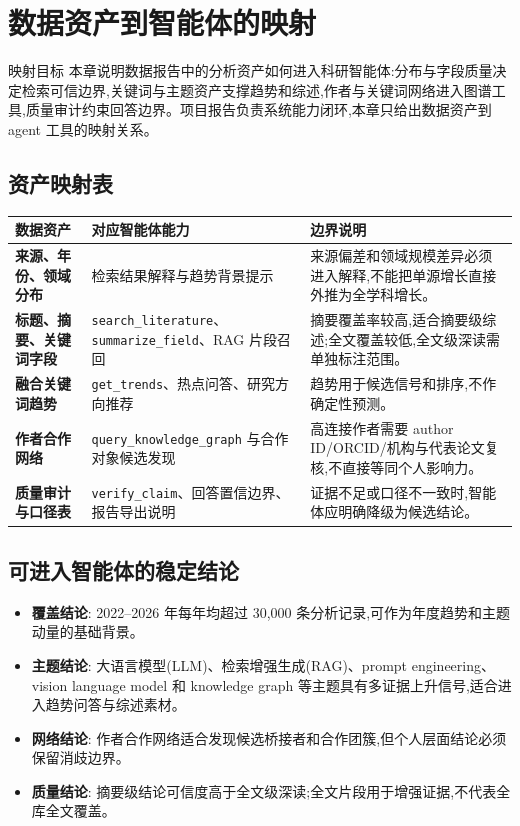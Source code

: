\section{数据资产到智能体的映射}

\begin{reportbox}{映射目标}
本章说明数据报告中的分析资产如何进入科研智能体:分布与字段质量决定检索可信边界,关键词与主题资产支撑趋势和综述,作者与关键词网络进入图谱工具,质量审计约束回答边界。项目报告负责系统能力闭环,本章只给出数据资产到 agent 工具的映射关系。
\end{reportbox}

\subsection{资产映射表}

\begin{tableblock}
\begin{tabularx}{\textwidth}{>{\bfseries}p{30mm}X X}
\toprule
数据资产 & 对应智能体能力 & 边界说明 \\
\midrule
来源、年份、领域分布 & 检索结果解释与趋势背景提示 & 来源偏差和领域规模差异必须进入解释,不能把单源增长直接外推为全学科增长。 \\
标题、摘要、关键词字段 & \texttt{search\_literature}、\texttt{summarize\_field}、RAG 片段召回 & 摘要覆盖率较高,适合摘要级综述;全文覆盖较低,全文级深读需单独标注范围。 \\
融合关键词趋势 & \texttt{get\_trends}、热点问答、研究方向推荐 & 趋势用于候选信号和排序,不作确定性预测。 \\
作者合作网络 & \texttt{query\_knowledge\_graph} 与合作对象候选发现 & 高连接作者需要 author ID/ORCID/机构与代表论文复核,不直接等同个人影响力。 \\
质量审计与口径表 & \texttt{verify\_claim}、回答置信边界、报告导出说明 & 证据不足或口径不一致时,智能体应明确降级为候选结论。 \\
\bottomrule
\end{tabularx}
\end{tableblock}

\subsection{可进入智能体的稳定结论}

\begin{itemize}
  \item \textbf{覆盖结论}: 2022--2026 年每年均超过 30,000 条分析记录,可作为年度趋势和主题动量的基础背景。
  \item \textbf{主题结论}: 大语言模型(LLM)、检索增强生成(RAG)、prompt engineering、vision language model 和 knowledge graph 等主题具有多证据上升信号,适合进入趋势问答与综述素材。
  \item \textbf{网络结论}: 作者合作网络适合发现候选桥接者和合作团簇,但个人层面结论必须保留消歧边界。
  \item \textbf{质量结论}: 摘要级结论可信度高于全文级深读;全文片段用于增强证据,不代表全库全文覆盖。
\end{itemize}

